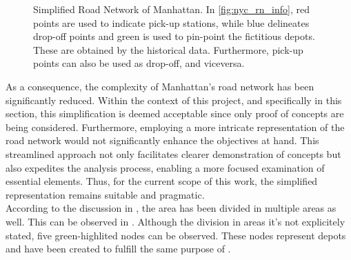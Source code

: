 \begin{figure}[t]
\begin{subfigure}[b]{0.35\textwidth}
		\caption{}
		\label{fig:nyc_rn_roads}
	\end{subfigure}
	\caption[Simplified Road Network of Manhattan]{Simplified Road Network of Manhattan. In \ref{fig:nyc_rn_info}, red points are used to indicate pick-up stations, while blue delineates drop-off points and green is used to pin-point the fictitious depots. These are obtained by the historical data. Furthermore, pick-up points can also be used as drop-off, and viceversa.  }
	\label{fig:nyc_rn}
\end{figure}

As a consequence, the complexity of Manhattan's road network has been significantly reduced. Within the context of this project, and specifically in this section, this simplification is deemed acceptable since only proof of concepts are being considered. Furthermore, employing a more intricate representation of the road network would not significantly enhance the objectives at hand. This streamlined approach not only facilitates clearer demonstration of concepts but also expedites the analysis process, enabling a more focused examination of essential elements. Thus, for the current scope of this work, the simplified representation remains suitable and pragmatic.\\
According to the discussion in , the area has been divided in multiple areas as well. This can be observed in . Although the division in areas it's not explicitely stated, five green-highlited nodes can be observed. These nodes represent depots and have been created to fulfill the same purpose of . 

